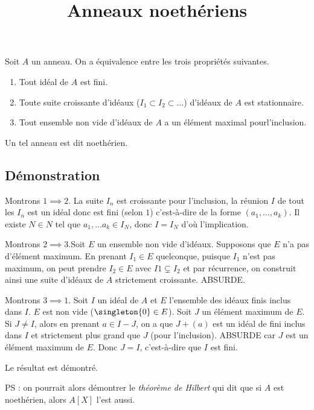 \documentclass[fontsize=12pt,twoside=false,parskip=half]{scrartcl}
\title{Anneaux noethériens}
\date{}
\author{}
\begin{document}
\maketitle
   \begin{Theoreme}
      Soit $A$ un anneau. On a équivalence entre les trois propriétés suivantes.
      \begin{enumerate}
         \item Tout idéal de $A$ est fini.
         \item Toute suite croissante d’idéaux ($I_1 \subset I_2 \subset \ldots$) d’idéaux de $A$
               est stationnaire.
         \item Tout ensemble non vide d’idéaux de $A$ a un élément maximal pourl’inclusion.
      \end{enumerate}
      Un tel anneau est dit noethérien.
   \end{Theoreme}
   \subsection{Démonstration}
      Montrons $1 \implies 2$. La suite $I_n$ est croissante pour l’inclusion, la réunion $I$ de
      tout les $I_n$ est un idéal donc est fini (selon $1$) c’est-à-dire de la forme $(a_1, \ldots
      , a_k)$. Il existe $N \in N$ tel que $a_1, \ldots a_k \in I_N$, donc $I = I_N$ d’où l’implication.

      Montrons $2 \implies 3$.Soit $E$ un ensemble non vide d’idéaux. Supposons que $E$ n’a pas
      d’élément maximum. En prenant $I_1 \in E$ quelconque, puisque $I_1$ n’est pas maximum, on 
      peut prendre $I_2 \in E$ avec $I1 \subsetneq I_2$ et par récurrence, on construit ainsi une
      suite d’idéaux de $A$ strictement croissante. ABSURDE. 
      
      Montrons $3 \implies 1$. Soit $I$ un idéal de $A$ et $E$ l’ensemble des idéaux finis inclus dans $I$. $E$ est non vide ($\singleton{0} \in E$). Soit $J$ un élément maximum de $E$. 
      Si $J \neq I$, alors en prenant $a \in I - J$, on a que $J + (a)$ est un idéal de fini inclus
      dans $I$ et strictement plus grand que $J$ (pour l’inclusion). ABSURDE car $J$ est un élément maximum de $E$. Donc $J = I$, c’est-à-dire que $I$ est fini.

      Le résultat est démontré. 
      
      PS : on pourrait alors démontrer le \emph{théorème de Hilbert} qui dit que si $A$ est noethérien,
      alors $A[X]$ l’est aussi.
\end{document}
